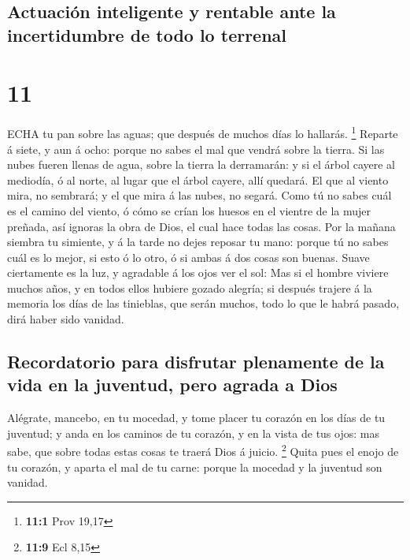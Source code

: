 \hypertarget{actuaciuxf3n-inteligente-y-rentable-ante-la-incertidumbre-de-todo-lo-terrenal}{%
\subsection{Actuación inteligente y rentable ante la incertidumbre de
todo lo
terrenal}\label{actuaciuxf3n-inteligente-y-rentable-ante-la-incertidumbre-de-todo-lo-terrenal}}

\hypertarget{section-10}{%
\section{11}\label{section-10}}

 ECHA tu pan sobre las aguas; que después de muchos días lo
hallarás. \footnote{\textbf{11:1} Prov 19,17}  Reparte á
siete, y aun á ocho: porque no sabes el mal que vendrá sobre la tierra.
 Si las nubes fueren llenas de agua, sobre la tierra la
derramarán: y si el árbol cayere al mediodía, ó al norte, al lugar que
el árbol cayere, allí quedará.  El que al viento mira, no
sembrará; y el que mira á las nubes, no segará.  Como tú no
sabes cuál es el camino del viento, ó cómo se crían los huesos en el
vientre de la mujer preñada, así ignoras la obra de Dios, el cual hace
todas las cosas.  Por la mañana siembra tu simiente, y á la
tarde no dejes reposar tu mano: porque tú no sabes cuál es lo mejor, si
esto ó lo otro, ó si ambas á dos cosas son buenas.  Suave
ciertamente es la luz, y agradable á los ojos ver el sol: 
Mas si el hombre viviere muchos años, y en todos ellos hubiere gozado
alegría; si después trajere á la memoria los días de las tinieblas, que
serán muchos, todo lo que le habrá pasado, dirá haber sido vanidad.

\hypertarget{recordatorio-para-disfrutar-plenamente-de-la-vida-en-la-juventud-pero-agrada-a-dios}{%
\subsection{Recordatorio para disfrutar plenamente de la vida en la
juventud, pero agrada a
Dios}\label{recordatorio-para-disfrutar-plenamente-de-la-vida-en-la-juventud-pero-agrada-a-dios}}

 Alégrate, mancebo, en tu mocedad, y tome placer tu corazón
en los días de tu juventud; y anda en los caminos de tu corazón, y en la
vista de tus ojos: mas sabe, que sobre todas estas cosas te traerá Dios
á juicio. \footnote{\textbf{11:9} Ecl 8,15}  Quita pues el
enojo de tu corazón, y aparta el mal de tu carne: porque la mocedad y la
juventud son vanidad.


